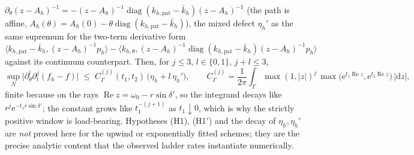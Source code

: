 \documentclass[aps,pre,reprint,amsmath,amssymb,longbibliography,floatfix]{revtex4-2}
\newcommand{\dd}{\mathrm d}
\newcommand{\e}{\mathrm e}
\begin{document}
\(\partial_\theta(z-A_h)^{-1}=-(z-A_h)^{-1}
\operatorname{diag}(k_{h,\mathrm{pat}}-\bar k_h)(z-A_h)^{-1}\)
(the path is affine,
\(A_h(\theta)=A_h(0)-\theta\operatorname{diag}(k_{h,\mathrm{pat}}-\bar k_h)\)),
the mixed defect \(\eta_h'\) as the same supremum for the two-term derivative
form
\(\langle k_{h,\mathrm{pat}}-\bar k_h,(z-A_h)^{-1}p_h\rangle
-\langle k_{h,\theta},(z-A_h)^{-1}
\operatorname{diag}(k_{h,\mathrm{pat}}-\bar k_h)(z-A_h)^{-1}p_h\rangle\)
against its continuum counterpart. Then, for \(j\le3\), \(l\in\{0,1\}\),
\(j+l\le3\),
\[
\sup_N\big|\partial_\theta^l\partial_t^j(f_h-f)\big|
\;\le\;C_\Gamma^{(j)}(t_1,t_2)\,\big(\eta_h+l\,\eta_h'\big),
\qquad
C_\Gamma^{(j)}
=\frac1{2\pi}\int_\Gamma\max(1,|z|)^{j}\,
\max\!\big(\e^{t_1\operatorname{Re}z},\e^{t_2\operatorname{Re}z}\big)
\,|\dd z|,
\]
finite because on the rays
\(\operatorname{Re}z=\omega_0-r\sin\delta'\), so the integrand decays like
\(r^{j}\e^{-t_1r\sin\delta'}\); the constant grows like
\(t_1^{-(j+1)}\) as \(t_1\downarrow0\), which is why the strictly positive
window is load-bearing. Hypotheses (H1), (H1$'$) and the decay of
\(\eta_h,\eta_h'\) are \emph{not} proved here for the upwind or
exponentially fitted schemes; they are the precise analytic content that the
observed ladder rates instantiate numerically.
\end{document}
